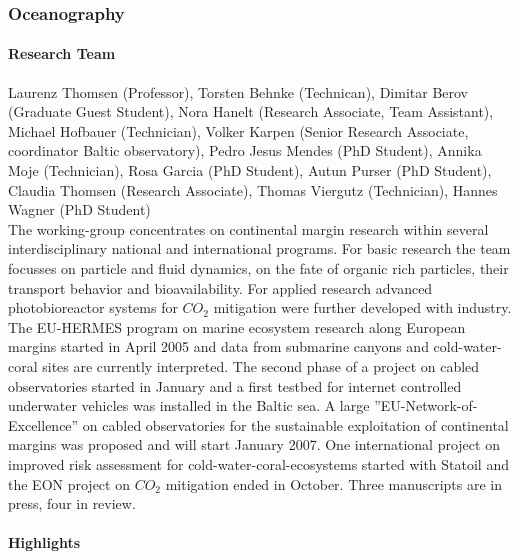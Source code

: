 \subsubsection{Oceanography }

\paragraph{Research Team}
Laurenz Thomsen (Professor), Torsten Behnke (Technican), Dimitar Berov
(Graduate Guest Student), Nora Hanelt (Research Associate, Team
Assistant), Michael Hofbauer (Technician), Volker Karpen (Senior
Research Associate, coordinator Baltic observatory), Pedro Jesus
Mendes (PhD Student), Annika Moje (Technician), Rosa Garcia (PhD
Student), Autun Purser (PhD Student), Claudia Thomsen (Research
Associate), Thomas Viergutz (Technician), Hannes Wagner (PhD
Student)\\

The working-group concentrates on continental margin research
within several interdisciplinary national and international
programs. For basic research the team focusses on particle and
fluid dynamics, on the fate of organic rich particles, their
transport behavior and bioavailability. For applied research
advanced photobioreactor systems for $CO_2$ mitigation were
further developed with industry. The EU-HERMES program on marine
ecosystem research along European margins started in April 2005
and data from submarine canyons and cold-water-coral sites are
currently interpreted. The second phase of a project on cabled
observatories started in January and a first testbed for internet
controlled underwater vehicles was installed in the Baltic sea. A
large ''EU-Network-of-Excellence'' on cabled observatories for the
sustainable exploitation of continental margins was proposed and
will start January 2007. One international project on improved
risk assessment for cold-water-coral-ecosystems started with
Statoil and the EON project on $CO_2$ mitigation ended in October.
Three manuscripts are in press, four in review.

\paragraph{Highlights}

